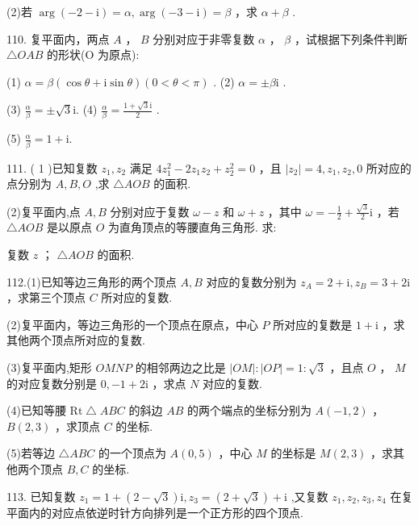 \documentclass[10pt]{article}
\newcommand*\circled[1]{\tikz[baseline=(char.base)]{\node[shape=circle,draw,inner sep=1.5pt] (char) {\small #1};}}
\begin{document}
(2)若 \(\arg \left( {-2 - \mathrm{i}}\right)  = \alpha ,\arg \left( {-3 - \mathrm{i}}\right)  = \beta\) ，求 \(\alpha  + \beta\) .

110. 复平面内，两点 \(A\) ， \(B\) 分别对应于非零复数 \(\alpha\) ， \(\beta\) ，试根据下列条件判断 \(\bigtriangleup {OAB}\) 的形状(O 为原点):

(1) \(\alpha  = \beta \left( {\cos \theta  + \mathrm{i}\sin \theta }\right) \left( {0 < \theta  < \pi }\right)\) . (2) \(\alpha  =  \pm  \beta \mathrm{i}\) .

(3) \(\frac{\alpha }{\beta } =  \pm  \sqrt{3}\mathrm{i}.\) (4) \(\frac{\alpha }{\beta } = \frac{1 + \sqrt{3}\mathrm{i}}{2}\) .

(5) \(\frac{\alpha }{\beta } = 1 + \mathrm{i}.\)

111. ( 1 )已知复数 \({z}_{1},{z}_{2}\) 满足 \(4{z}_{1}^{2} - 2{z}_{1}{z}_{2} + {z}_{2}^{2} = 0\) ，且 \(\left| {z}_{2}\right|  = 4,{z}_{1},{z}_{2},0\) 所对应的点分别为 \(A,B,O\) ,求 \(\bigtriangleup {AOB}\) 的面积.

(2)复平面内,点 \(A,B\) 分别对应于复数 \(\omega  - z\) 和 \(\omega  + z\) ，其中 \(\omega  =  - \frac{1}{2} + \frac{\sqrt{3}}{2}\mathrm{i}\) ，若 \(\bigtriangleup {AOB}\) 是以原点 \(O\) 为直角顶点的等腰直角三角形. 求:

 \circled{1}  复数 \(z\) ；  \circled{2}  \(\bigtriangleup  {AOB}\) 的面积.

112.(1)已知等边三角形的两个顶点 \(A,B\) 对应的复数分别为 \({z}_{A} = 2 + \mathrm{i},{z}_{B} = 3 + 2\mathrm{i}\) ，求第三个顶点 \(C\) 所对应的复数.

(2)复平面内，等边三角形的一个顶点在原点，中心 \(P\) 所对应的复数是 \(1 + \mathrm{i}\) ，求其他两个顶点所对应的复数.

(3)复平面内,矩形 \({OMNP}\) 的相邻两边之比是 \(\left| {OM}\right|  : \left| {OP}\right|  = 1 : \sqrt{3}\) ，且点 \(O\) ， \(M\) 的对应复数分别是 \(0, - 1 + 2\mathrm{i}\) ，求点 \(N\) 对应的复数.

(4)已知等腰 \(\mathrm{{Rt}} \bigtriangleup  {ABC}\) 的斜边 \({AB}\) 的两个端点的坐标分别为 \(A\left( {-1,2}\right)\) ， \(B\left( {2,3}\right)\) ，求顶点 \(C\) 的坐标.

(5)若等边 \(\bigtriangleup  {ABC}\) 的一个顶点为 \(A\left( {0,5}\right)\) ，中心 \(M\) 的坐标是 \(M\left( {2,3}\right)\) ，求其他两个顶点 \(B,C\) 的坐标.

113. 已知复数 \({z}_{1} = 1 + \left( {2 - \sqrt{3}}\right) \mathrm{i},{z}_{3} = \left( {2 + \sqrt{3}}\right)  + \mathrm{i}\) ,又复数 \({z}_{1},{z}_{2},{z}_{3},{z}_{4}\) 在复平面内的对应点依逆时针方向排列是一个正方形的四个顶点.
\end{document}
